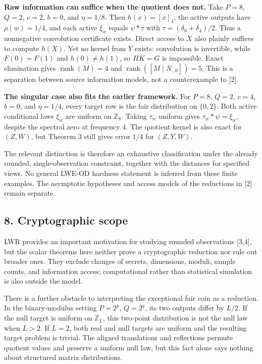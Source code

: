 \documentclass[
]{article}
\begin{document}
\textbf{Raw information can suffice when the quotient does not.} Take
\(P=8\), \(Q=2\), \(c=2\), \(b=0\), and \(\eta=1/8\). Then
\(h(x)=[x]_4\), the active outputs have \(\rho(w)=1/4\), and each active
\(\xi_w\) equals \(\psi*\tau\) with \(\tau=(\delta_0+\delta_4)/2\). Thus
a nonnegative convolution certificate exists. Direct access to \(X\)
also plainly suffices to compute \(h(X)\). Yet no kernel from \(Y\)
exists: convolution is invertible, while \(F(0)=F(1)\) and
\(h(0)\ne h(1)\), so \(HK=G\) is impossible. Exact elimination gives
\(\operatorname{rank}(M)=4\) and
\(\operatorname{rank}([M\mid N_{\cdot,0}])=5\). This is a separation
between source information models, not a counterexample to {[}2{]}.

\textbf{The singular case also fits the earlier framework.} For \(P=8\),
\(Q=2\), \(c=4\), \(b=0\), and \(\eta=1/4\), every target row is the
fair distribution on \(\{0,2\}\). Both active conditional laws \(\xi_w\)
are uniform on \(\mathbb Z_8\). Taking \(\tau_w\) uniform gives
\(\tau_w*\psi=\xi_w\), despite the spectral zero at frequency \(4\). The
quotient kernel is also exact for \((Z,W)\), but Theorem 3 still gives
error \(1/4\) for \((Z,Y,W)\).

The relevant distinction is therefore an exhaustive classification under
the already rounded, single-observation constraint, together with the
distances for specified views. No general LWE-OD hardness statement is
inferred from these finite examples. The asymptotic hypotheses and
access models of the reductions in {[}2{]} remain separate.

\subsection{8. Cryptographic scope}\label{cryptographic-scope}

LWR provides an important motivation for studying rounded observations
{[}3,4{]}, but the scalar theorems here neither prove a cryptographic
reduction nor rule out broader ones. They exclude changes of secrets,
dimensions, moduli, sample counts, and information access; computational
rather than statistical simulation is also outside the model.

There is a further obstacle to interpreting the exceptional fair coin as
a reduction. In the binary-modulus setting \(P=2^p\), \(Q=2^q\), its two
outputs differ by \(L/2\). If the null target is uniform on
\(\mathbb Z_L\), this two-point distribution is not the null law when
\(L>2\). If \(L=2\), both real and null targets are uniform and the
resulting target problem is trivial. The aligned translations and
reflections permute quotient values and preserve a uniform null law, but
this fact alone says nothing about structured matrix distributions.
\end{document}
